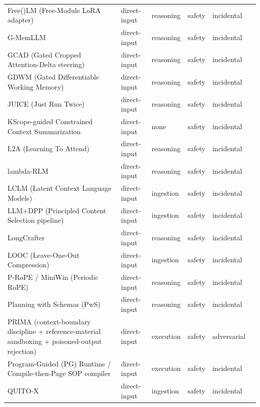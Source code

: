 \begin{longtable}{@{}>{\raggedright\arraybackslash}p{}lllll@{}}
Free()LM (Free-Module LoRA adapter) & direct-input & reasoning & safety & incidental & \cite{zheng-2026-free} \\
G-MemLLM & direct-input & reasoning & safety & incidental & \cite{xu-2026-gmemllm} \\
GCAD (Gated Cropped Attention-Delta steering) & direct-input & reasoning & safety & incidental & \cite{kang-2026-promptactivation} \\
GDWM (Gated Differentiable Working Memory) & direct-input & reasoning & safety & incidental & \cite{mei-2026-gated} \\
JUICE (Just Run Twice) & direct-input & reasoning & safety & incidental & \cite{li-2025-taming} \\
KScope-guided Constrained Context Summarization & direct-input & none & safety & incidental & \cite{xiao-2025-kscope} \\
L2A (Learning To Attend) & direct-input & reasoning & safety & incidental & \cite{choudhary-2026-learning} \\
lambda-RLM & direct-input & reasoning & safety & incidental & \cite{roy-2026-ycombinator} \\
LCLM (Latent Context Language Models) & direct-input & ingestion & safety & incidental & \cite{li-2026-endtoend} \\
LLM+DPP (Principled Content Selection pipeline) & direct-input & ingestion & safety & incidental & \cite{padmakumar-2025-principled} \\
LongCrafter & direct-input & reasoning & safety & incidental & \cite{yuan-2026-longcrafter} \\
LOOC (Leave-One-Out Compression) & direct-input & ingestion & safety & incidental & \cite{wang-2026-alleviating} \\
P-RoPE / MiniWin (Periodic RoPE) & direct-input & reasoning & safety & incidental & \cite{huo-2026-periodic} \\
Planning with Schemas (PwS) & direct-input & reasoning & safety & incidental & \cite{xu-2025-cognitive} \\
PRIMA (context-boundary discipline + reference-material sandboxing + poisoned-output rejection) & direct-input & execution & safety & adversarial & \cite{annapureddy-2026-prima} \\
Program-Guided (PG) Runtime / Compile-then-Page SOP compiler & direct-input & execution & safety & incidental & \cite{yu-2026-compile} \\
QUITO-X & direct-input & ingestion & safety & incidental & \cite{wang-2024-quitox} \\

\end{longtable}
